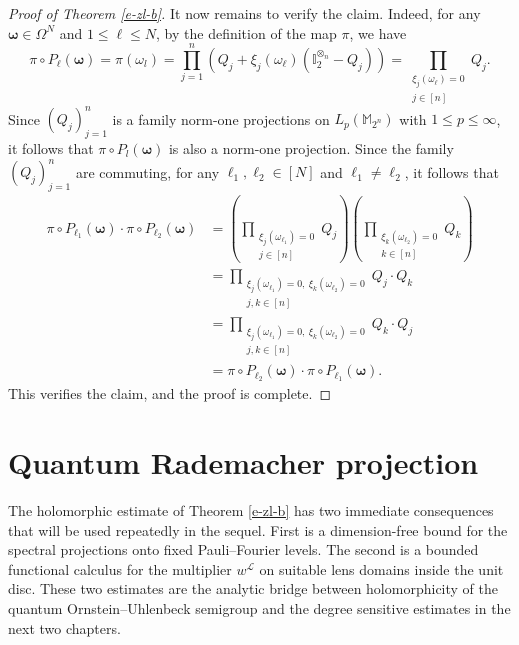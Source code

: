 \documentclass{amsbook}
\theoremstyle{definition}
\theoremstyle{remark}
\numberwithin{section}{chapter}
\numberwithin{equation}{chapter}
\newcommand{\1}{\mathbf{1}}
\begin{document}
\begin{proof}[Proof of Theorem \ref{e-zl-b}]
It now remains to verify the claim. Indeed, for any $\mathbf{\omega} \in\Omega^N$ and  $1\leq \ell\leq N$, by the definition of the map $\pi$, we have
$$\pi\circ P_{\ell}(\mathbf{\omega})=\pi(\omega_l)=\prod_{j=1}^n(Q_j+\xi_j(\omega_{\ell})(\mathbb{I}_2^{\otimes_n}-Q_j))=\prod_{\substack{\xi_j(\omega_{\ell})=0\\j\in[n]}}Q_j.$$
Since $(Q_j)_{j=1}^n$ is a family  norm-one projections on $L_p(\mathbb{M}_{2^n})$ with $1\leq p\leq\infty$, it follows that
$\pi\circ P_l(\mathbf{\omega})$ is also a norm-one projection.
Since the family $(Q_j)_{j=1}^n$ are  commuting,  for any $\ell_1,\ell_2\in[N]$ and $\ell_1\neq \ell_2$, it follows that
\begin{align*}
\pi\circ P_{\ell_1}(\mathbf{\omega})\cdot\pi\circ P_{\ell_2}(\mathbf{\omega})&=\left(\prod_{\substack{\xi_j(\omega_{\ell_1})=0\\j\in[n]}}Q_j\right)\left(\prod_{\substack{\xi_k(\omega_{\ell_2})=0\\k\in[n]}}Q_k\right)\\
&=\prod_{\substack{\xi_j(\omega_{\ell_1})=0,~\xi_k(\omega_{\ell_2})=0\\j,k\in[n]}}Q_j\cdot Q_k\\
&=\prod_{\substack{\xi_j(\omega_{\ell_1})=0,~\xi_k(\omega_{\ell_2})=0\\j,k\in[n]}}Q_k\cdot Q_j\\
&=\pi\circ P_{\ell_2}(\mathbf{\omega})\cdot\pi\circ P_{\ell_1}(\mathbf{\omega}).
\end{align*}
This verifies the claim, and
the proof is complete.
\end{proof}

\section{Quantum Rademacher projection}\label{sec-qr-projection}
The holomorphic estimate of Theorem \ref{e-zl-b} has two immediate consequences that will be used repeatedly in the sequel. First is a dimension-free bound for the spectral projections onto fixed Pauli--Fourier levels.  The second is a bounded functional calculus for the multiplier $w^{\mathcal L}$ on suitable lens domains inside the unit disc.  These two estimates are the analytic bridge between holomorphicity of the quantum Ornstein--Uhlenbeck semigroup and the degree sensitive estimates in the next two chapters.
\end{document}
